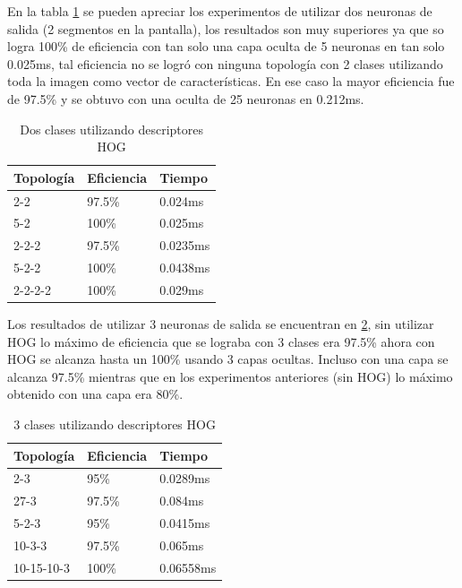 En la tabla \ref{Hog2Clases} se pueden apreciar los experimentos de utilizar dos neuronas de salida (2 segmentos en la pantalla), los resultados son muy superiores ya que so logra 100\% de eficiencia con tan solo una capa oculta de 5 neuronas en tan solo 0.025ms, tal eficiencia no se logró con ninguna topología con 2 clases utilizando toda la imagen como vector de características. En ese caso la mayor eficiencia fue de 97.5\% y se obtuvo con una oculta de 25 neuronas en 0.212ms.
\begin{table}[]
	\centering
	\caption{Dos clases utilizando descriptores HOG}
	\label{my-label}
	\begin{tabular}{|l|l|l|}
		\hline
		Topología & Eficiencia & Tiempo   \\ \hline
		2-2       & 97.5\%     & 0.024ms  \\ \hline
		5-2       & 100\%      & 0.025ms  \\ \hline
		2-2-2     & 97.5\%     & 0.0235ms \\ \hline
		5-2-2     & 100\%      & 0.0438ms \\ \hline
		2-2-2-2   & 100\%      & 0.029ms  \\ \hline
	\end{tabular}\label{Hog2Clases}
\end{table}

Los resultados de utilizar 3 neuronas de salida se encuentran en \ref{Hog3Clases}, sin utilizar HOG lo máximo de eficiencia que se lograba con 3 clases era 97.5\% ahora con HOG se alcanza hasta un 100\% usando 3 capas ocultas. Incluso con una capa se alcanza 97.5\% mientras que en los experimentos anteriores (sin HOG) lo máximo obtenido con una capa era 80\%.

\begin{table}[]
	\centering
	\caption{3 clases utilizando descriptores HOG}
	\label{my-label}
	\begin{tabular}{|l|l|l|}
		\hline
		Topología  & Eficiencia & Tiempo    \\ \hline
		2-3        & 95\%       & 0.0289ms  \\ \hline
		27-3       & 97.5\%     & 0.084ms   \\ \hline
		5-2-3      & 95\%       & 0.0415ms  \\ \hline
		10-3-3     & 97.5\%     & 0.065ms   \\ \hline
		10-15-10-3 & 100\%      & 0.06558ms \\ \hline
	\end{tabular}\label{Hog3Clases}
\end{table}


